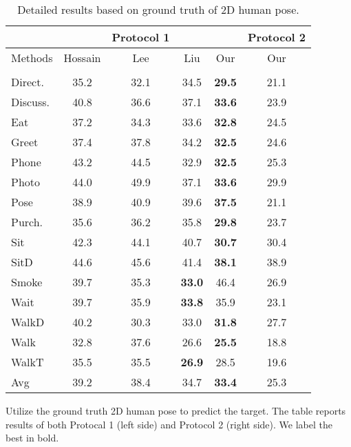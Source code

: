 \documentclass[runningheads]{llncs}
\begin{document}
\begin{table}[!htp]
\centering
\caption{Detailed results based on ground truth of 2D human pose.}\label{tab3}
\setlength{\tabcolsep}{8pt} \renewcommand{\arraystretch}{1} \begin{threeparttable}
\begin{tabular}{|l|ccc |c|c|}
\hline 
 & & Protocol 1 &  &  & Protocol 2\\
\hline 
Methods &Hossain & Lee & Liu & Our & Our\\
&\cite{Hossain_2018} & \cite{Lee_2018_ECCV} & \cite{Liu_2020_CVPR} & &\\
\hline
Direct.&35.2&32.1&34.5&\textbf{29.5}&21.1\\
Discuss.&40.8& 36.6&37.1&\textbf{33.6}&23.9\\
Eat& 37.2& 34.3&33.6&\textbf{32.8}&24.5\\
Greet&37.4&37.8&34.2&\textbf{32.5}&24.6\\
Phone&43.2 &44.5&32.9&\textbf{32.5}&25.3\\
Photo&44.0&49.9& 37.1&\textbf{33.6}&29.9\\
Pose&38.9&40.9&39.6&\textbf{37.5}&21.1\\
Purch.&35.6 &36.2&35.8&\textbf{29.8}&23.7\\
Sit&42.3&44.1&40.7&\textbf{30.7}&30.4\\
SitD& 44.6& 45.6& 41.4&\textbf{38.1}&38.9\\
Smoke& 39.7&35.3& \textbf{33.0}&46.4&26.9\\
Wait& 39.7&35.9&\textbf{33.8}&35.9&23.1\\
WalkD&40.2&30.3&33.0&\textbf{31.8}&27.7\\
Walk& 32.8&37.6&26.6&\textbf{25.5}&18.8\\
WalkT&35.5& 35.5&\textbf{26.9}&28.5&19.6\\
\hline
Avg& 39.2&38.4&34.7&\textbf{33.4}&25.3\\

\hline
\end{tabular}
\begin{tablenotes}
        \footnotesize
        \item *Utilize the ground truth 2D human pose to predict the target. The table reports results of both Protocal 1 (left side) and Protocol 2 (right side). We label the best in bold.
\end{tablenotes}
\end{threeparttable}
\end{table}
\end{document}
